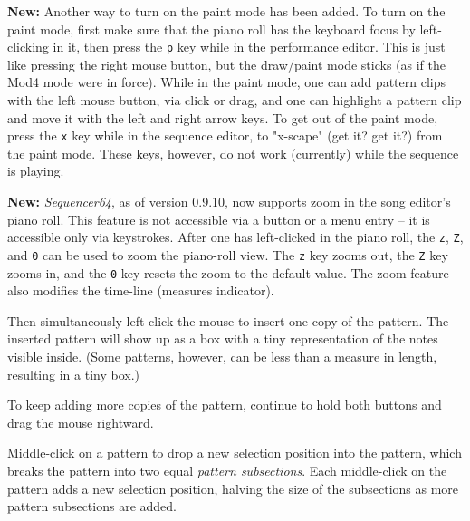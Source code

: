    \textbf{New:}
   Another way to turn on the paint mode has been added.
   To turn on the paint mode, first make sure that the piano roll has the
   keyboard focus by left-clicking in it, then press the
   \texttt{p} key while in the performance editor.
   This is just like pressing the right mouse button, but the draw/paint mode
   sticks (as if the Mod4 mode were in force).
   While in the paint mode, one can add pattern clips with the left mouse
   button, via click or drag, and one can highlight a pattern clip and move it
   with the left and right arrow keys.
   To get out of the paint mode, press the
   \texttt{x} key while in the sequence editor, to "x-scape" (get it?  get it?)
   from the paint mode.
   These keys, however, do not work (currently) while the sequence is playing.

   \textbf{New:}
   \textsl{Sequencer64}, as of version 0.9.10, now supports zoom in the song
   editor's piano roll.  This feature is not accessible via a button or a menu
   entry -- it is accessible only via keystrokes.
   After one has left-clicked in the piano roll, the \texttt{z}, \texttt{Z},
   and \texttt{0} can be used to zoom the piano-roll view.  The \texttt{z} key
   zooms out, the \texttt{Z} key zooms in, and the \texttt{0} key resets the
   zoom to the default value.  The zoom feature also modifies the time-line
   (measures indicator).

   Then simultaneously left-click the mouse to insert one copy of the
   pattern.  The inserted pattern will show up as a box with a tiny
   representation of the notes visible inside.  (Some patterns, however, can
   be less than a measure in length, resulting in a tiny box.)

   To keep adding more copies of the pattern, continue to hold both buttons
   and drag the mouse rightward.

   Middle-click on a pattern to drop a new selection position into the
   pattern,
   which breaks the pattern into two equal \textsl{pattern subsections}.
   Each middle-click on the pattern adds a new selection position,
   halving the size of the subsections as more pattern subsections are
   added.

